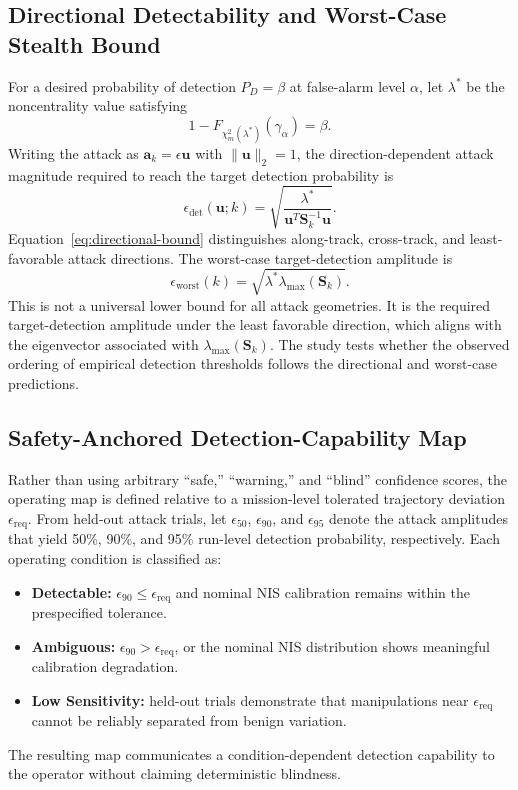 \documentclass[11pt,a4paper]{article}
\begin{document}
\subsection{Directional Detectability and Worst-Case Stealth Bound}
For a desired probability of detection $P_D=\beta$ at false-alarm level $\alpha$, let $\lambda^*$ be the noncentrality value satisfying
\begin{equation}
1-F_{\chi^2_m(\lambda^*)}(\gamma_\alpha)=\beta.
\end{equation}
Writing the attack as $\mathbf{a}_k=\epsilon\mathbf{u}$ with $\|\mathbf{u}\|_2=1$, the direction-dependent attack magnitude required to reach the target detection probability is
\begin{equation}
\epsilon_{\mathrm{det}}(\mathbf{u};k)=
\sqrt{\frac{\lambda^*}{\mathbf{u}^T\mathbf{S}_k^{-1}\mathbf{u}}}.
\label{eq:directional-bound}
\end{equation}
Equation~\eqref{eq:directional-bound} distinguishes along-track, cross-track, and least-favorable attack directions. The worst-case target-detection amplitude is
\begin{equation}
\epsilon_{\mathrm{worst}}(k)=
\sqrt{\lambda^*\lambda_{\max}(\mathbf{S}_k)}.
\label{eq:worst-bound}
\end{equation}
This is not a universal lower bound for all attack geometries. It is the required target-detection amplitude under the least favorable direction, which aligns with the eigenvector associated with $\lambda_{\max}(\mathbf{S}_k)$. The study tests whether the observed ordering of empirical detection thresholds follows the directional and worst-case predictions.

\subsection{Safety-Anchored Detection-Capability Map}
Rather than using arbitrary ``safe,'' ``warning,'' and ``blind'' confidence scores, the operating map is defined relative to a mission-level tolerated trajectory deviation $\epsilon_{\mathrm{req}}$. From held-out attack trials, let $\epsilon_{50}$, $\epsilon_{90}$, and $\epsilon_{95}$ denote the attack amplitudes that yield 50\%, 90\%, and 95\% run-level detection probability, respectively. Each operating condition is classified as:
\begin{itemize}
    \item \textbf{Detectable:} $\epsilon_{90}\leq\epsilon_{\mathrm{req}}$ and nominal NIS calibration remains within the prespecified tolerance.
    \item \textbf{Ambiguous:} $\epsilon_{90}>\epsilon_{\mathrm{req}}$, or the nominal NIS distribution shows meaningful calibration degradation.
    \item \textbf{Low Sensitivity:} held-out trials demonstrate that manipulations near $\epsilon_{\mathrm{req}}$ cannot be reliably separated from benign variation.
\end{itemize}
The resulting map communicates a condition-dependent detection capability to the operator without claiming deterministic blindness.
\end{document}
